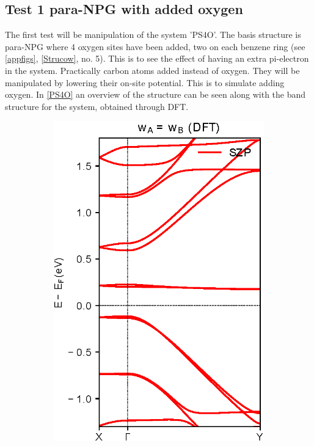 \subsection{Test 1 para-NPG with added oxygen}
The first test will be manipulation of the system 'PS4O'. The basis structure is para-NPG where 4 oxygen sites have been added, two on each benzene ring (see \cref{appfigs}, \cref{Strucow}, no. 5). This is to see the effect of having an extra pi-electron in the system. Practically carbon atoms added instead of oxygen. They will be manipulated by lowering their on-site potential. This is to simulate adding oxygen. In \cref{PS4O} an overview of the structure can be seen along with the band structure for the system, obtained through DFT. 
\begin{figure}[h]
    \centering
    \begin{subfigure}[b]{0.5\textwidth}
    \centering
    \includegraphics[width=\textwidth]{Figures/PS4ODFT.eps}

\end{subfigure}
\end{figure}
